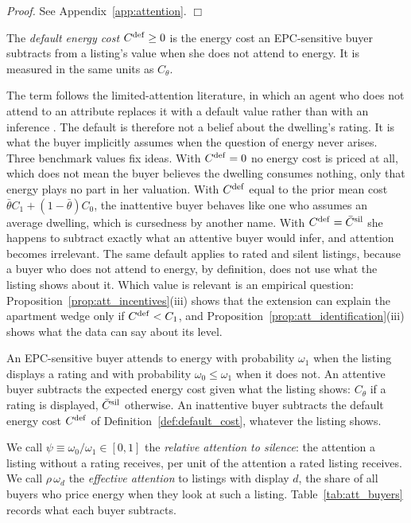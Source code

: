 \noindent\textit{Proof.} See Appendix~\ref{app:attention}. $\Box$

\begin{definition}
\label{def:default_cost}
The \emph{default energy cost} $C^{\rm def}\ge0$ is the energy cost an EPC-sensitive buyer subtracts from a listing's value when she does not attend to energy. It is measured in the same units as $C_\theta$.
\end{definition}

The term follows the limited-attention literature, in which an agent who does not attend to an attribute replaces it with a default value rather than with an inference \citep{gabaix_sparsity_2014, gabaix_behavioral_2019}. The default is therefore not a belief about the dwelling's rating. It is what the buyer implicitly assumes when the question of energy never arises. Three benchmark values fix ideas. With $C^{\rm def}=0$ no energy cost is priced at all, which does not mean the buyer believes the dwelling consumes nothing, only that energy plays no part in her valuation. With $C^{\rm def}$ equal to the prior mean cost $\bar\theta C_1+(1-\bar\theta)C_0$, the inattentive buyer behaves like one who assumes an average dwelling, which is cursedness by another name. With $C^{\rm def}=\bar C^{\rm sil}$ she happens to subtract exactly what an attentive buyer would infer, and attention becomes irrelevant. The same default applies to rated and silent listings, because a buyer who does not attend to energy, by definition, does not use what the listing shows about it. Which value is relevant is an empirical question: Proposition~\ref{prop:att_incentives}(iii) shows that the extension can explain the apartment wedge only if $C^{\rm def}<C_1$, and Proposition~\ref{prop:att_identification}(iii) shows what the data can say about its level.

\begin{assumption}
\label{assum:attention}
An EPC-sensitive buyer attends to energy with probability $\omega_1$ when the listing displays a rating and with probability $\omega_0\le\omega_1$ when it does not. An attentive buyer subtracts the expected energy cost given what the listing shows: $C_\theta$ if a rating is displayed, $\bar C^{\rm sil}$ otherwise. An inattentive buyer subtracts the default energy cost $C^{\rm def}$ of Definition~\ref{def:default_cost}, whatever the listing shows.
\end{assumption}

We call $\psi\equiv\omega_0/\omega_1\in[0,1]$ the \emph{relative attention to silence}: the attention a listing without a rating receives, per unit of the attention a rated listing receives. We call $\rho\,\omega_d$ the \emph{effective attention} to listings with display $d$, the share of all buyers who price energy when they look at such a listing. Table~\ref{tab:att_buyers} records what each buyer subtracts.

